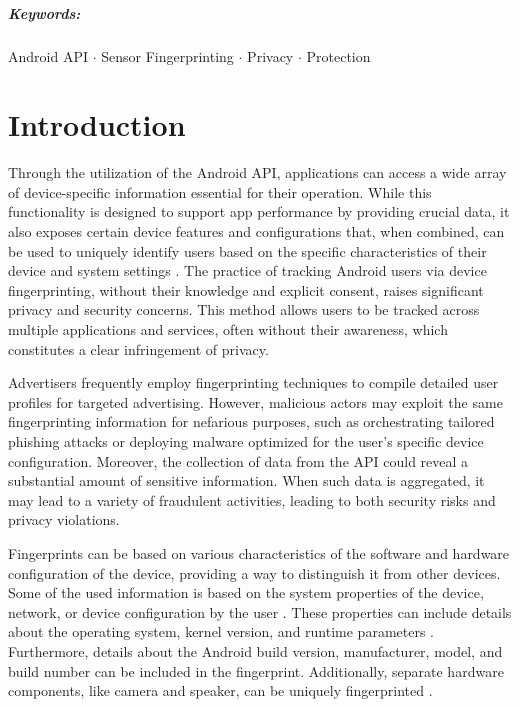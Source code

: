 \documentclass[11pt,
  oneside,openany,    %
]{scrreprt}
\begin{document}
\paragraph{Keywords:}
Android API $\cdot$
Sensor Fingerprinting $\cdot$
Privacy $\cdot$
Protection

\cleardoublepage

\chapter{Introduction}
\label{chap:introduction}

Through the utilization of the Android API, applications can access a wide array of device-specific information essential for their operation.
While this functionality is designed to support app performance by providing crucial data, it also exposes certain device features and configurations that, when combined, can be used to uniquely identify users based on the specific characteristics of their device and system settings \cite{DBLP:conf/IEEEares/PalfingerP20}.
The practice of tracking Android users via device fingerprinting, without their knowledge and explicit consent, raises significant privacy and security concerns.
This method allows users to be tracked across multiple applications and services, often without their awareness, which constitutes a clear infringement of privacy.

Advertisers frequently employ fingerprinting techniques to compile detailed user profiles for targeted advertising.
However, malicious actors may exploit the same fingerprinting information for nefarious purposes, such as orchestrating tailored phishing attacks or deploying malware optimized for the user's specific device configuration.
Moreover, the collection of data from the API could reveal a substantial amount of sensitive information.
When such data is aggregated, it may lead to a variety of fraudulent activities, leading to both security risks and privacy violations.

Fingerprints can be based on various characteristics of the software and hardware configuration of the device, providing a way to distinguish it from other devices.
Some of the used information is based on the system properties of the device, network, or device configuration by the user \cite{DBLP:journals/popets/KurtzGBRF16}. 
These properties can include details about the operating system, kernel version, and runtime parameters \cite{DBLP:journals/access/WuWWLY16}.
Furthermore, details about the Android build version, manufacturer, model, and build number can be included in the fingerprint. 
Additionally, separate hardware components, like camera and speaker, can be uniquely fingerprinted \cite{DBLP:journals/tifs/Li10, DBLP:journals/popets/DasBC18}.
\end{document}
